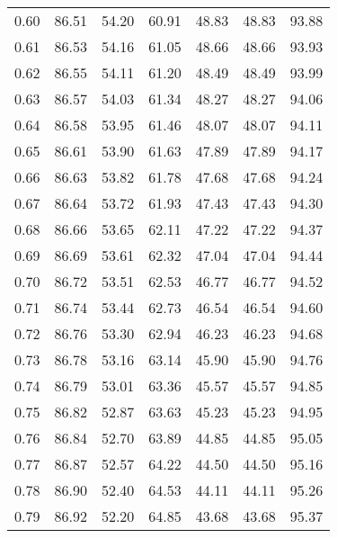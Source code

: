 \begin{tabular}{|c|c|c|c|c|c|c|}
      0.60 &     86.51 &     54.20 &      60.91 &   48.83 &      48.83 &         93.88 \\
      0.61 &     86.53 &     54.16 &      61.05 &   48.66 &      48.66 &         93.93 \\
      0.62 &     86.55 &     54.11 &      61.20 &   48.49 &      48.49 &         93.99 \\
      0.63 &     86.57 &     54.03 &      61.34 &   48.27 &      48.27 &         94.06 \\
      0.64 &     86.58 &     53.95 &      61.46 &   48.07 &      48.07 &         94.11 \\
      0.65 &     86.61 &     53.90 &      61.63 &   47.89 &      47.89 &         94.17 \\
      0.66 &     86.63 &     53.82 &      61.78 &   47.68 &      47.68 &         94.24 \\
      0.67 &     86.64 &     53.72 &      61.93 &   47.43 &      47.43 &         94.30 \\
      0.68 &     86.66 &     53.65 &      62.11 &   47.22 &      47.22 &         94.37 \\
      0.69 &     86.69 &     53.61 &      62.32 &   47.04 &      47.04 &         94.44 \\
      0.70 &     86.72 &     53.51 &      62.53 &   46.77 &      46.77 &         94.52 \\
      0.71 &     86.74 &     53.44 &      62.73 &   46.54 &      46.54 &         94.60 \\
      0.72 &     86.76 &     53.30 &      62.94 &   46.23 &      46.23 &         94.68 \\
      0.73 &     86.78 &     53.16 &      63.14 &   45.90 &      45.90 &         94.76 \\
      0.74 &     86.79 &     53.01 &      63.36 &   45.57 &      45.57 &         94.85 \\
      0.75 &     86.82 &     52.87 &      63.63 &   45.23 &      45.23 &         94.95 \\
      0.76 &     86.84 &     52.70 &      63.89 &   44.85 &      44.85 &         95.05 \\
      0.77 &     86.87 &     52.57 &      64.22 &   44.50 &      44.50 &         95.16 \\
      0.78 &     86.90 &     52.40 &      64.53 &   44.11 &      44.11 &         95.26 \\
      0.79 &     86.92 &     52.20 &      64.85 &   43.68 &      43.68 &         95.37 \\

\end{tabular}
